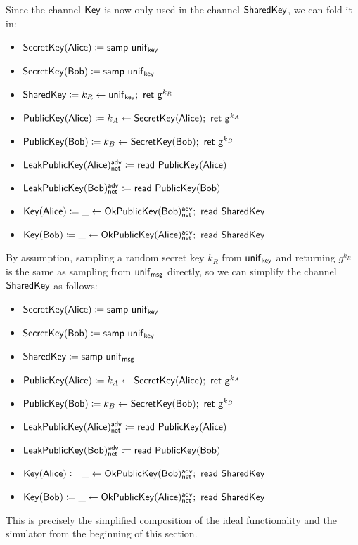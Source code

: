 \noindent Since the channel $\Key$ is now only used in the channel $\SharedKey$, we can fold it in:

\begin{itemize}
\item $\SecretKey(\Alice) \coloneqq \samp{\unif_\key}$
\item $\SecretKey(\Bob) \coloneqq \samp{\unif_\key}$
\item {\color{red} $\SharedKey \coloneqq k_R \leftarrow \unif_\key; \ \ret{\gen^{k_R}}$}
\item $\PublicKey(\Alice) \coloneqq k_A \leftarrow \SecretKey(\Alice); \ \ret{\gen^{k_A}}$
\item $\PublicKey(\Bob) \coloneqq k_B \leftarrow \SecretKey(\Bob); \ \ret{\gen^{k_B}}$
\item $\LeakPublicKey(\Alice)^\adv_\net \coloneqq \read{\PublicKey(\Alice)}$
\item $\LeakPublicKey(\Bob)^\adv_\net \coloneqq \read{\PublicKey(\Bob)}$
\item $\Key(\Alice) \coloneqq \_ \leftarrow \OkPublicKey(\Bob)^\adv_\net; \ \read{\SharedKey}$
\item $\Key(\Bob) \coloneqq \_ \leftarrow \OkPublicKey(\Alice)^\adv_\net; \ \read{\SharedKey}$
\end{itemize}

\noindent By assumption, sampling a random secret key $k_R$ from $\unif_\key$ and returning $g^{k_R}$ is the same as sampling from $\unif_\msg$ directly, so we can simplify the channel $\SharedKey$ as follows:

\begin{itemize}
\item $\SecretKey(\Alice) \coloneqq \samp{\unif_\key}$
\item $\SecretKey(\Bob) \coloneqq \samp{\unif_\key}$
\item {\color{red} $\SharedKey \coloneqq \samp{\unif_\msg}$}
\item $\PublicKey(\Alice) \coloneqq k_A \leftarrow \SecretKey(\Alice); \ \ret{\gen^{k_A}}$
\item $\PublicKey(\Bob) \coloneqq k_B \leftarrow \SecretKey(\Bob); \ \ret{\gen^{k_B}}$
\item $\LeakPublicKey(\Alice)^\adv_\net \coloneqq \read{\PublicKey(\Alice)}$
\item $\LeakPublicKey(\Bob)^\adv_\net \coloneqq \read{\PublicKey(\Bob)}$
\item $\Key(\Alice) \coloneqq \_ \leftarrow \OkPublicKey(\Bob)^\adv_\net; \ \read{\SharedKey}$
\item $\Key(\Bob) \coloneqq \_ \leftarrow \OkPublicKey(\Alice)^\adv_\net; \ \read{\SharedKey}$
\end{itemize}

\noindent This is precisely the simplified composition of the ideal functionality and the simulator from the beginning of this section.